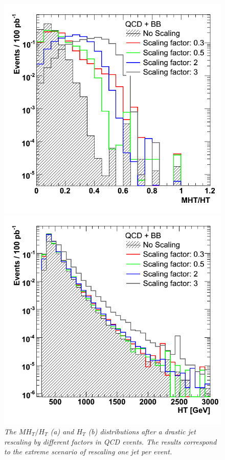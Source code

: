\begin{figure}[h!]
\begin{minipage}[b]{0.5\linewidth}
\centering
\includegraphics[scale=0.37]{./plots/MHTovHT-NT7-Scaling.png} 
\end{minipage}
\begin{minipage}[b]{0.5\linewidth}
\centering
\includegraphics[scale=0.37]{./plots/HT-NT7-Scaling.png} 
\end{minipage}
\caption{\textit{The $MH_{T} / H_{T}$ (a) and $H_{T}$ (b) distributions after a drastic jet rescaling by different factors in QCD events. The results correspond to the extreme scenario of rescaling one jet per event.} }

\label{fig:scale2}
\end{figure}


